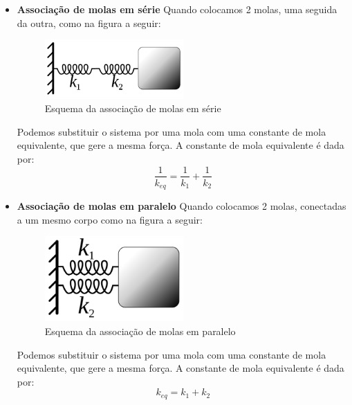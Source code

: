 \documentclass[12pt]{extarticle}
\newcommand{\<}{\langle}
\renewcommand{\>}{\rangle}
\theoremstyle{definition}
\begin{document}
\begin{itemize}
    \item \textbf{Associação de molas em série}
    Quando colocamos 2 molas, uma seguida da outra, como na figura a seguir:
    
    \begin{figure}[h]
        \centering
        \includegraphics[width=0.5\textwidth]{300px-SpringsInSeries.svg.png}
        \caption{Esquema da associação de molas em série}
        \label{fig:serie}
    \end{figure}
    
        Podemos substituir o sistema por uma mola com uma constante de mola equivalente, que gere a mesma força. A constante de mola equivalente é dada por:
    \begin{equation}
        \frac{1}{k_{eq}} = \frac{1}{k_1} + \frac{1}{k_2}
    \end{equation}
    
    \item\textbf{Associação de molas em paralelo}
    Quando colocamos 2 molas, conectadas a um mesmo corpo como na figura a seguir:
    
    \begin{figure}[h]
        \centering
        \includegraphics[width=0.5\textwidth]{1200px-SpringsInParallel.svg.png}
        \caption{Esquema da associação de molas em paralelo}
        \label{fig:serie}
    \end{figure}
    
    Podemos substituir o sistema por uma mola com uma constante de mola equivalente, que gere a mesma força. A constante de mola equivalente é dada por:
    \begin{equation}
        k_{eq} = k_1 + k_2
    \end{equation}
\end{itemize}
\end{document}
